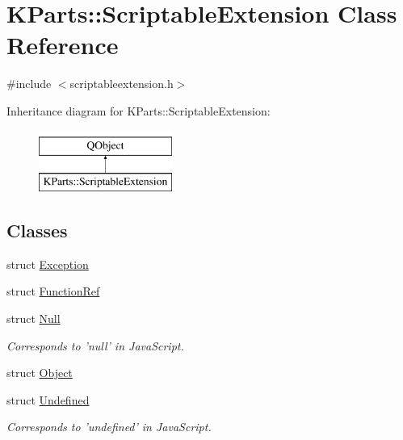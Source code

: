 \hypertarget{classKParts_1_1ScriptableExtension}{\section{K\+Parts\+:\+:Scriptable\+Extension Class Reference}
\label{classKParts_1_1ScriptableExtension}
}


{\ttfamily \#include $<$scriptableextension.\+h$>$}

Inheritance diagram for K\+Parts\+:\+:Scriptable\+Extension\+:\begin{figure}[H]
\begin{center}
\leavevmode
\includegraphics[height=2.000000cm]{classKParts_1_1ScriptableExtension}
\end{center}
\end{figure}
\subsection*{Classes}
\begin{DoxyCompactItemize}
\item 
struct \hyperlink{structKParts_1_1ScriptableExtension_1_1Exception}{Exception}
\item 
struct \hyperlink{structKParts_1_1ScriptableExtension_1_1FunctionRef}{Function\+Ref}
\item 
struct \hyperlink{structKParts_1_1ScriptableExtension_1_1Null}{Null}
\begin{DoxyCompactList}\small\item\em Corresponds to 'null' in Java\+Script. \end{DoxyCompactList}\item 
struct \hyperlink{structKParts_1_1ScriptableExtension_1_1Object}{Object}
\item 
struct \hyperlink{structKParts_1_1ScriptableExtension_1_1Undefined}{Undefined}
\begin{DoxyCompactList}\small\item\em Corresponds to 'undefined' in Java\+Script. \end{DoxyCompactList}\end{DoxyCompactItemize}
